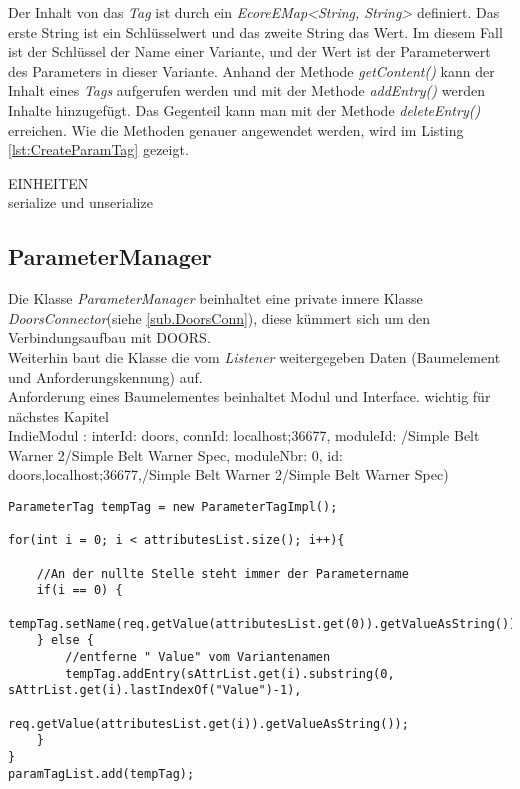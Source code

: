 Der Inhalt von das \textit{Tag} ist durch ein \textit{EcoreEMap<String, String>} definiert. Das erste String ist ein Schlüsselwert und das zweite String das Wert. Im diesem Fall ist der Schlüssel der Name einer Variante, und der Wert ist der Parameterwert des Parameters in dieser Variante.  Anhand der Methode \textit{getContent()} kann der Inhalt eines \textit{Tags} aufgerufen werden und mit der Methode \textit{addEntry()} werden Inhalte hinzugefügt. Das Gegenteil kann man mit der Methode \textit{deleteEntry()} erreichen. Wie die Methoden genauer angewendet werden, wird im Listing \ref{lst:CreateParamTag} gezeigt.

EINHEITEN\\

serialize und unserialize\\


\subsection{ParameterManager}\label{sub.ParameterManager}


Die Klasse \textit{ParameterManager} beinhaltet eine private innere Klasse \textit{DoorsConnector}(siehe \ref{sub.DoorsConn}), diese kümmert sich um den Verbindungsaufbau mit DOORS.\\ Weiterhin baut die Klasse die vom \textit{Listener} weitergegeben Daten (Baumelement und Anforderungskennung) auf.\\



Anforderung eines Baumelementes beinhaltet Modul und Interface. wichtig für nächstes Kapitel\\

IndieModul : interId: doors, connId: localhost;36677, moduleId: /Simple Belt Warner 2/Simple Belt Warner Spec, moduleNbr: 0, id: doors,localhost;36677,/Simple Belt Warner 2/Simple Belt Warner Spec)\\


\begin{lstlisting}[caption={Erstellung der ParameterTag}, captionpos=b,label={lst:CreateParamTag}]
ParameterTag tempTag = new ParameterTagImpl();
		
for(int i = 0; i < attributesList.size(); i++){
	
	//An der nullte Stelle steht immer der Parametername
	if(i == 0) {
		tempTag.setName(req.getValue(attributesList.get(0)).getValueAsString());
	} else {
		//entferne " Value" vom Variantenamen 
		tempTag.addEntry(sAttrList.get(i).substring(0, sAttrList.get(i).lastIndexOf("Value")-1),
				req.getValue(attributesList.get(i)).getValueAsString());
	}
}
paramTagList.add(tempTag);
\end{lstlisting}


